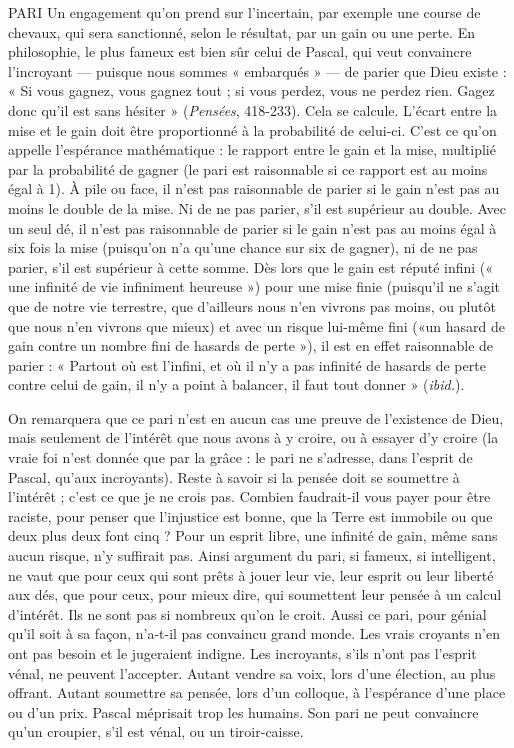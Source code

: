 PARI Un engagement qu’on prend sur l’incertain, par exemple une course
de chevaux, qui sera sanctionné, selon le résultat, par un gain ou
une perte. En philosophie, le plus fameux est bien sûr celui de Pascal, qui
veut convaincre l’incroyant — puisque nous sommes « embarqués » — de
parier que Dieu existe : « Si vous gagnez, vous gagnez tout ; si vous perdez,
vous ne perdez rien. Gagez donc qu’il est sans hésiter » ({\it Pensées}, 418-233).
Cela se calcule. L'écart entre la mise et le gain doit être proportionné à la
probabilité de celui-ci. C’est ce qu’on appelle l’espérance mathématique : le
rapport entre le gain et la mise, multiplié par la probabilité de gagner (le pari
est raisonnable si ce rapport est au moins égal à 1). À pile ou face, il n’est
pas raisonnable de parier si le gain n’est pas au moins le double de la mise.
Ni de ne pas parier, s’il est supérieur au double. Avec un seul dé, il n’est pas
raisonnable de parier si le gain n’est pas au moins égal à six fois la mise
(puisqu'on n’a qu’une chance sur six de gagner), ni de ne pas parier, s’il est
supérieur à cette somme. Dès lors que le gain est réputé infini (« une infinité
de vie infiniment heureuse ») pour une mise finie (puisqu'il ne s’agit que de
notre vie terrestre, que d’ailleurs nous n’en vivrons pas moins, ou plutôt que
nous n’en vivrons que mieux) et avec un risque lui-même fini («un hasard
de gain contre un nombre fini de hasards de perte »), il est en effet raisonnable
de parier : « Partout où est l’infini, et où il n’y a pas infinité de hasards
de perte contre celui de gain, il n’y a point à balancer, il faut tout donner »
({\it ibid.}).

On remarquera que ce pari n’est en aucun cas une preuve de l'existence de
Dieu, mais seulement de l’intérêt que nous avons à y croire, ou à essayer d’y
croire (la vraie foi n’est donnée que par la grâce : le pari ne s’adresse, dans
l'esprit de Pascal, qu'aux incroyants). Reste à savoir si la pensée doit se soumettre
à l'intérêt ; c’est ce que je ne crois pas. Combien faudrait-il vous payer
pour être raciste, pour penser que l'injustice est bonne, que la Terre est immobile
ou que deux plus deux font cinq ? Pour un esprit libre, une infinité de
gain, même sans aucun risque, n’y suffirait pas. Ainsi argument du pari, si
fameux, si intelligent, ne vaut que pour ceux qui sont prêts à jouer leur vie, leur
esprit ou leur liberté aux dés, que pour ceux, pour mieux dire, qui soumettent
leur pensée à un calcul d'intérêt. Ils ne sont pas si nombreux qu’on le croit.
Aussi ce pari, pour génial qu'il soit à sa façon, n’a-t-il pas convaincu grand
monde. Les vrais croyants n’en ont pas besoin et le jugeraient indigne. Les
incroyants, s'ils n’ont pas l’esprit vénal, ne peuvent l’accepter. Autant vendre sa
voix, lors d’une élection, au plus offrant. Autant soumettre sa pensée, lors d’un
colloque, à l’espérance d’une place ou d’un prix. Pascal méprisait trop les
humains. Son pari ne peut convaincre qu’un croupier, s’il est vénal, ou un
tiroir-caisse.

